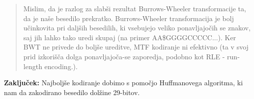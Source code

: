 \documentclass{article}
\begin{document}
\begin{enumerate}
\begin{enumerate}
			\begin{quote}
				Mislim, da je razlog za slabši rezultat Burrows-Wheeler transformacije ta,
				da je naše besedilo prekratko. Burrows-Wheeler transformacija je bolj učinkovita 
				pri daljših besedilih, ki vsebujejo veliko ponavljajočih se znakov, saj jih lahko tako 
				uredi skupaj (na primer AA\$GGGGCCCCC...). Ker BWT ne privede do boljše ureditve, MTF 
				kodiranje ni efektivno (ta v svoj prid izkorišča dolga ponavljajoča-se zaporedja, podobno
				kot RLE - run-length encoding.).
			\end{quote}

			\textbf{Zaključek:} Najboljše kodiranje dobimo s pomočjo Huffmanovega algoritma, ki nam da 
			zakodirano besedilo dolžine 29-bitov.

		\end{enumerate}

\end{enumerate}
\end{document}
